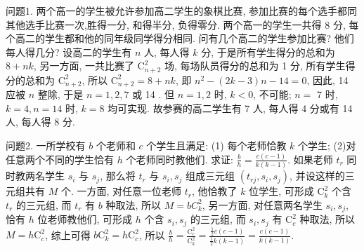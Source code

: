 
问题1. 两个高一的学生被允许参加高二学生的象棋比赛, 参加比赛的每个选手都同其他选手比赛一次,胜得一分, 和得半分, 负得零分.
两个高一的学生一共得 8 分, 每个高二的学生都和他的同年级同学得分相同.
问有几个高二的学生参加比赛? 他们每人得几分?
设高二的学生有 $n$ 人, 每人得 $k$ 分, 于是所有学生得分的总和为 $8+ n k$, 另一方面, 一共比赛了 $\mathrm{C}_{n+2}^2$ 场, 每场队员得分的总和为 1 分, 所有学生得分的总和为 $\mathrm{C}_{n+2}^2$, 所以 $\mathrm{C}_{n+2}^2=8+n k$, 即 $n^2-(2 k-3) n-14=0$, 因此, 14 应被 $n$ 整除, 于是 $n=1,2,7$ 或 14 . 但 $n=1,2$ 时, $k<0$, 不可能; $n=$ 7 时, $k=4, n=14$ 时, $k=8$ 均可实现.
故参赛的高二学生有 7 人, 每人得 4 分或有 14 人, 每人得 8 分.



问题2. 一所学校有 $b$ 个老师和 $c$ 个学生且满足: (1) 每个老师恰教 $k$ 个学生; (2)对任意两个不同的学生恰有 $h$ 个老师同时教他们.
求证: $\frac{b}{h}= \frac{c(c-1)}{k(k-1)}$.
如果老师 $t_r$ 同时教两名学生 $s_i$ 与 $s_j$, 那么将 $t_r$ 与 $s_i, s_j$ 组成三元组 $\left(t_{r j}, s_i, s_j\right)$, 并设这样的三元组共有 $M$ 个.
一方面, 对任意一位老师 $t_r$, 他恰教了 $k$ 位学生, 可形成 $\mathrm{C}_k^2$ 个含 $t_r$ 的三元组, 而 $t_r$ 有 $b$ 种取法, 所以 $M=b C_k^2$, 另一方面, 对任意两名学生 $s_i, s_j$, 恰有 $h$ 位老师教他们, 可形成 $h$ 个含 $s_i, s_j$ 的三元组, 而 $s_i, s_j$ 有 $\mathrm{C}_c^2$ 种取法, 所以 $M=h \mathrm{C}_c^2$, 综上可得 $b \mathrm{C}_k^2=h \mathrm{C}_c^2$, 所以 $\frac{b}{h}=\frac{\mathrm{C}_c^2}{\mathrm{C}_k^2}=\frac{\frac{1}{2} c(c-1)}{\frac{1}{2} k(k-1)}=\frac{c(c-1)}{k(k-1)}$.



